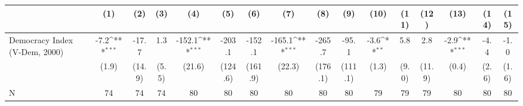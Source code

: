 {
\def\sym#1{\ifmmode^{#1}\else\(^{#1}\)\fi}
\begin{tabular}{l*{15}{c}}
\hline\hline
                    &\multicolumn{1}{c}{(1)}         &\multicolumn{1}{c}{(2)}         &\multicolumn{1}{c}{(3)}         &\multicolumn{1}{c}{(4)}         &\multicolumn{1}{c}{(5)}         &\multicolumn{1}{c}{(6)}         &\multicolumn{1}{c}{(7)}         &\multicolumn{1}{c}{(8)}         &\multicolumn{1}{c}{(9)}         &\multicolumn{1}{c}{(10)}         &\multicolumn{1}{c}{(11)}         &\multicolumn{1}{c}{(12)}         &\multicolumn{1}{c}{(13)}         &\multicolumn{1}{c}{(14)}         &\multicolumn{1}{c}{(15)}         \\
\hline
Democracy Index (V-Dem, 2000)&        -7.2\sym{***}&       -17.7         &         1.3         &      -152.1\sym{***}&      -203.1         &      -152.1         &      -165.1\sym{***}&      -265.7         &       -95.1         &        -3.6\sym{**} &         5.8         &         2.8         &        -2.9\sym{***}&        -4.4         &        -1.0         \\
                    &       (1.9)         &      (14.9)         &       (5.5)         &      (21.6)         &     (124.6)         &     (161.9)         &      (22.3)         &     (176.1)         &     (111.1)         &       (1.3)         &       (9.0)         &      (11.9)         &       (0.4)         &       (2.6)         &       (1.6)         \\
\hline
N                   &          74         &          74         &          74         &          80         &          80         &          80         &          80         &          80         &          80         &          79         &          79         &          79         &          80         &          80         &          80         \\
\hline\hline
\end{tabular}
}
